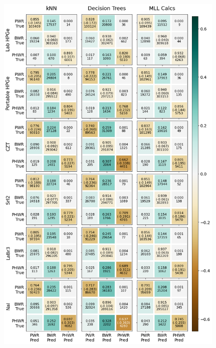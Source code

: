 \begin{frame}
\begin{minipage}{0.5\textwidth}
\begin{figure}
      \includegraphics[height=0.88\textheight]{./figures/confusion_matrix_6dets_short.png}
    \end{figure}
  \end{minipage}
\end{frame}

